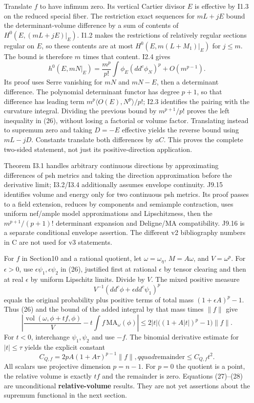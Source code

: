 \documentclass[
  11pt,
]{article}
\begin{document}
Translate \(f\) to have infimum zero. Its vertical Cartier divisor \(E\)
is effective by I1.3 on the reduced special fiber. The restriction exact
sequences for \(mL+jE\) bound the determinant-volume difference by a sum
of contents of \(H^0(E,(mL+jE)|_E)\). I1.2 makes the restrictions of
relatively regular sections regular on \(E\), so these contents are at
most \(H^0(E,m(L+M_1)|_E)\) for \(j\leq m\). The bound is therefore
\(m\) times that content. I2.4 gives
\[ h^0(E,mN|_E)=\frac{m^p}{p!}\int\phi_E(dd^c\phi_N)^p+O(m^{p-1}).\] Its
proof uses Serre vanishing for \(mN\) and \(mN-E\), then a determinant
difference. The polynomial determinant functor has degree \(p+1\), so
that difference has leading term \(m^p\langle O(E),N^p\rangle/p!\); I2.3
identifies the pairing with the curvature integral. Dividing the
previous bound by \(m^{p+1}/p!\) proves the left inequality in (26),
without losing a factorial or volume factor. Translating instead to
supremum zero and taking \(D=-E\) effective yields the reverse bound
using \(mL-jD\). Constants translate both differences by \(aC\). This
proves the complete two-sided statement, not just its positive-direction
application.

Theorem I3.1 handles arbitrary continuous directions by approximating
differences of psh metrics and taking the direction approximation before
the derivative limit; I3.2/I3.4 additionally assumes envelope
continuity. J9.15 identifies volume and energy only for two continuous
psh metrics. Its proof passes to a field extension, reduces by
components and semiample contraction, uses uniform nef/ample model
approximations and Lipschitzness, then the \(m^{p+1}/(p+1)!\)
determinant expansion and Deligne/MA compatibility. J9.16 is a separate
conditional envelope assertion. The different v2 bibliography numbers in
C are not used for v3 statements.

For \(f\) in Section10 and a rational quotient, let
\(\omega=\omega_\eta\), \(M=A\omega\), and \(V=\omega^p\). For
\(\epsilon>0\), use \(\epsilon\psi_1,\epsilon\psi_2\) in (26), justified
first at rational \(\epsilon\) by tensor clearing and then at real
\(\epsilon\) by uniform Lipschitz limits. Divide by \(V\). The mixed
positive measure \[ V^{-1}(dd^c\phi+\epsilon dd^c\psi_1)^p\] equals the
original probability plus positive terms of total mass
\((1+\epsilon A)^p-1\). Thus (26) and the bound of the added integral by
that mass times \(\|f\|\) give
\[ \left|\frac{\operatorname{vol}(\omega,\phi+t f,\phi)}{V}
          -t\int f\,\mathrm{MA}_\omega(\phi)\right|
 \leq2|t|\big((1+A|t|)^p-1\big)\|f\|.                                 \tag{27}\]
For \(t<0\), interchange \(\psi_1,\psi_2\) and use \(-f\). The binomial
derivative estimate for \(|t|\leq\tau\) yields the explicit constant
\[ C_{Q,f}=2pA(1+A\tau)^{p-1}\|f\|,qquad \text{remainder}\leq C_{Q,f}t^2. \tag{28}\]
All scalars use projective dimension \(p=n-1\). For \(p=0\) the quotient
is a point, the relative volume is exactly \(tf\) and the remainder is
zero. Equations (27)--(28) are unconditional \textbf{relative-volume}
results. They are not yet assertions about the supremum functional in
the next section.
\end{document}
